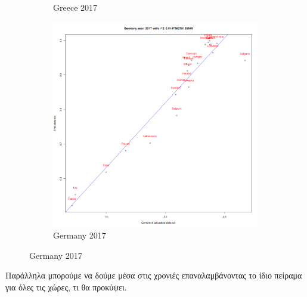 \documentclass[a4paper,twoside,10pt]{article}
\begin{document}
\begin{figure}[H]
\begin{subfigure}[b]{0.3\textwidth}
			\caption{Greece 2017}
			\label{fig:Greece_2017}
		\end{subfigure}
		\hfill
		\begin{subfigure}[b]{0.3\textwidth}
			\centering
			\includegraphics[width=\textwidth]{images/Germany 2017.png}
			\caption{Germany 2017}
			\label{fig:Germany_2017}
		\end{subfigure}
		\label{fig:3_examples}
	\end{figure}
	
	Παράλληλα μπορούμε να δούμε μέσα στις χρονιές επαναλαμβάνοντας το ίδιο πείραμα για όλες τις χώρες, τι θα προκύψει. 
	
\end{document}
